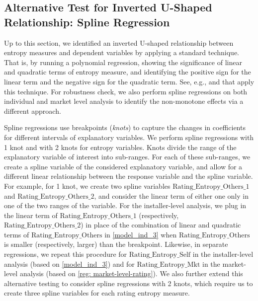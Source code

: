 \documentclass[msom,blindrev]{informs3}
\begin{document}
	
	
	
	\subsection{Alternative Test for Inverted U-Shaped Relationship: Spline Regression}
	
	
	Up to this section, we identified an inverted U-shaped relationship between entropy measures and dependent variables by applying a standard technique. That is, by running a polynomial regression, showing the significance of linear and quadratic terms of entropy measure, and identifying the positive sign for the linear term and the negative sign for the quadratic term. See, e.g., \cite{tan2014does} and \cite{kesavan2014volume} that apply this technique. For robustness check, we also perform spline regressions on both individual and market level analysis to identify the non-monotone effects via a different approach.

	
	Spline regressions use breakpoints (\emph{knots}) to capture the changes in coefficients for different intervals of explanatory variables. We perform spline regressions with 1 knot and with 2 knots for entropy variables. Knots divide the range of the explanatory variable of interest into sub-ranges. For each of these sub-ranges, we create a spline variable of the considered explanatory variable, and allow for a different linear relationship between the response variable and the spline variable. For example, for 1 knot, we create two spline variables $\text{Rating\_Entropy\_Others\_1}$ and  $\text{Rating\_Entropy\_Others\_2}$, and consider the linear term of either one only in one of the two ranges of the variable. For the installer-level analysis, we plug in the linear term of $\text{Rating\_Entropy\_Others\_1}$ (respectively, $\text{Rating\_Entropy\_Others\_2}$) in place of the combination of linear and quadratic terms of $\text{Rating\_Entropy\_Others}$ in \eqref{model_ind_3} when $\text{Rating\_Entropy\_Others}$ is smaller (respectively, larger) than the breakpoint.  Likewise, in separate regressions, we repeat this procedure for $\text{Rating\_Entropy\_Self}$ in the installer-level analysis (based on \eqref{model_ind_3}) and  for $\text{Rating\_Entropy\_Mkt}$ in the market-level analysis (based on \eqref{reg: market-level-rating}). We also further extend this alternative testing to consider spline regressions with 2 knots, which require us to create three spline variables for each rating entropy measure.
	
\end{document}
